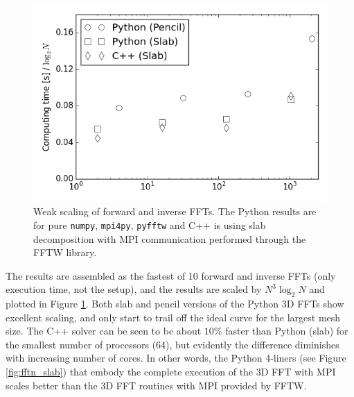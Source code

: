 \documentclass[final,1p,times]{elsarticle}
\newcommand{\inpyth}{\lstinline[style=inlinestyle]} %[]%
\begin{document}


\begin{figure}[ht!]
\centering
\includegraphics[scale=0.48]{figs/weak_scaling_fft_1024.png}
\caption{Weak scaling of forward and inverse FFTs. The Python results are for pure \texttt{numpy}, \texttt{mpi4py}, \texttt{pyfftw} and C++ is using slab decomposition with MPI communication performed through the FFTW library.}
\label{fig:weak_FFT_scaling}
\end{figure}

The results are assembled as the fastest of 10 forward and inverse FFTs (only execution time, not the setup), and the results
are scaled by $N^3 \log_2N$ and plotted in Figure \ref{fig:weak_FFT_scaling}. Both slab and pencil versions of the Python 3D FFTs show excellent scaling,
and only start to trail off the ideal curve for the largest mesh size. The C++ solver can be seen to be about $10 \%$ faster than Python (slab) for the smallest number of processors (64), but evidently the difference diminishes with increasing number of cores. In other words, the Python 4-liners (see Figure \ref{fig:fftn_slab}) that embody the complete execution of the 3D FFT with MPI scales better than the 3D FFT routines with MPI provided by FFTW.  
\end{document}
